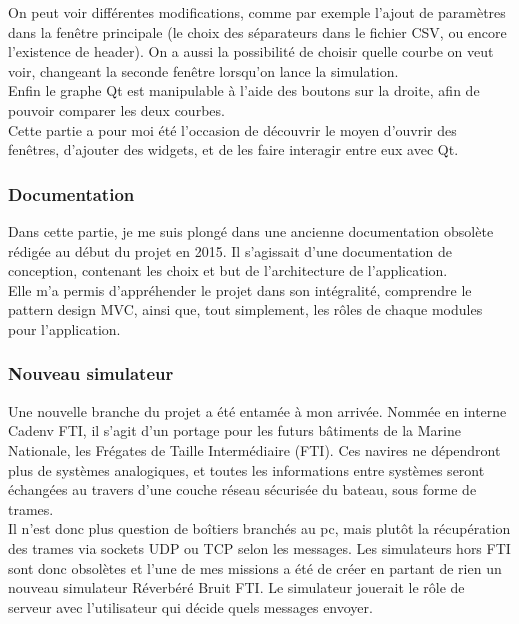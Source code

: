 \documentclass{rapport}
\begin{document}

On peut voir différentes modifications, comme par exemple l'ajout de paramètres dans la fenêtre principale (le choix des séparateurs dans le fichier CSV, ou encore l'existence de header). On a aussi la possibilité de choisir quelle courbe on veut voir, changeant la seconde fenêtre lorsqu'on lance la simulation.\\
Enfin le graphe Qt est manipulable à l'aide des boutons sur la droite, afin de pouvoir comparer les deux courbes.\\

Cette partie a pour moi été l'occasion de découvrir le moyen d'ouvrir des fenêtres, d'ajouter des widgets, et de les faire interagir entre eux avec Qt.

\subsubsection{Documentation}

Dans cette partie, je me suis plongé dans une ancienne documentation obsolète rédigée au début du projet en 2015. Il s'agissait d'une documentation de conception, contenant les choix et but de l'architecture de l'application. \\

Elle m'a permis d'appréhender le projet dans son intégralité, comprendre le pattern design MVC, ainsi que, tout simplement, les rôles de chaque modules pour l'application.

\subsubsection{Nouveau simulateur}

Une nouvelle branche du projet a été entamée à mon arrivée. Nommée en interne Cadenv FTI, il s'agit d'un portage pour les futurs bâtiments de la Marine Nationale, les Frégates de Taille Intermédiaire (FTI). Ces navires ne dépendront plus de systèmes analogiques, et toutes les informations entre systèmes seront échangées au travers d'une couche réseau sécurisée du bateau, sous forme de trames.\\

Il n'est donc plus question de boîtiers branchés au pc, mais plutôt la récupération des trames via sockets UDP ou TCP selon les messages. Les simulateurs hors FTI sont donc obsolètes et l'une de mes missions a été de créer en partant de rien un nouveau simulateur Réverbéré Bruit FTI. Le simulateur jouerait le rôle de serveur avec l'utilisateur qui décide quels messages envoyer. \\
\end{document}
